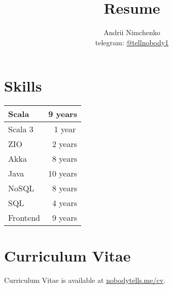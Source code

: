 

\title{Resume}
\author{
  Andrii Nimchenko\\
  telegram: \href{https://t.me/tellnobody1}{@tellnobody1}
}
\date{}
\maketitle

\section*{Skills}
\begin{table}[H]
  \begin{tabular}{lr}
  Scala    &  9 years    \\ \hline
  Scala 3  &  1 year\:\, \\ \hline
  ZIO      &  2 years    \\ \hline
  Akka     &  8 years    \\ \hline
  Java     & 10 years    \\ \hline
  NoSQL    &  8 years    \\ \hline
  SQL      &  4 years    \\ \hline
  Frontend &  9 years    \\
  \end{tabular}
\end{table}

\section*{Curriculum Vitae}
Curriculum Vitae is available at \href{https://nobodytells.me/cv/}{nobodytells.me/cv}.

